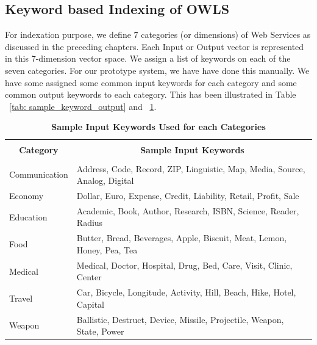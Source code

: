 \documentclass[12pt, oneside]{book}
\begin{document}
\subsection{Keyword based Indexing of OWLS}
For indexation purpose, we define 7 categories (or dimensions) of Web Services as discussed in the preceding chapters. Each Input or Output vector is represented in this 7-dimension vector space. We assign a list of keywords on each of the seven categories. For our prototype system, we have have done this manually. We have some assigned some common input keywords for each category and some common output keywords to each category. This has been illustrated in Table ~\ref{tab: sample_keyword_output} and ~\ref{tab: sample_keyword_input}.

\begin{table}[h]
	\begin{center}
		\caption{\textbf{Sample Input Keywords Used for each Categories}}
		\begin{tabular}{| p{} | p{} |}
			\hline
			\multicolumn{1}{|c|}{} & \multicolumn{1}{c|}{} \\
			\multicolumn{1}{|c|}{\textbf{Category}} & \multicolumn{1}{c|}{\textbf{Sample Input Keywords}} \\
			\multicolumn{1}{|c|}{} & \multicolumn{1}{c|}{} \\
			\hline
			Communication & Address, Code, Record, ZIP, Linguistic, Map, Media, Source, Analog, Digital \\ \hline
			Economy &  Dollar, Euro, Expense, Credit, Liability, Retail, Profit, Sale\\ \hline
			Education & Academic, Book, Author, Research, ISBN, Science, Reader, Radius\\ \hline
			Food & Butter, Bread, Beverages, Apple, Biscuit, Meat, Lemon, Honey, Pea, Tea\\ \hline
			Medical & Medical, Doctor, Hospital, Drug, Bed, Care, Visit, Clinic, Center\\ \hline
			Travel & Car, Bicycle, Longitude, Activity, Hill, Beach, Hike, Hotel, Capital\\ \hline
			Weapon & Ballistic, Destruct, Device, Missile, Projectile, Weapon, State, Power\\ \hline
		\end{tabular}
	\end{center}
	\label{tab: sample_keyword_input}
\end{table}
\end{document}
